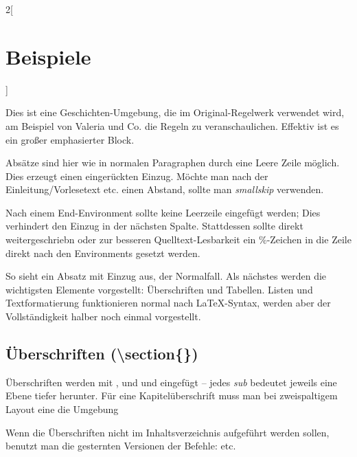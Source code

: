 \documentclass[linksbund,ATvorVT]{rpg-ilaris}
\begin{document}
\begin{multicols}{2}[        %
		\chapter*{Beispiele}  %
		]                    %

\begin{geschichte}
	Dies ist eine Geschichten-Umgebung, die im Original-Regelwerk verwendet wird, am Beispiel von Valeria und Co. die Regeln zu veranschaulichen. Effektiv ist es ein großer emphasierter Block.

	Absätze sind hier wie in normalen Paragraphen durch eine Leere Zeile möglich. Dies erzeugt einen eingerückten Einzug. Möchte man nach der Einleitung/Vorlesetext etc. einen Abstand, sollte man \emph{smallskip} verwenden.
\end{geschichte}

Nach einem End-Environment sollte keine Leerzeile eingefügt werden; Dies verhindert den Einzug in der nächsten Spalte. Stattdessen sollte direkt weitergeschriebn oder zur besseren Quelltext-Lesbarkeit ein \%-Zeichen in die Zeile direkt nach den Environments gesetzt werden.

So sieht ein Absatz mit Einzug aus, der Normalfall. Als nächstes werden die wichtigsten Elemente vorgestellt: Überschriften und Tabellen. Listen und Textformatierung funktionieren normal nach \LaTeX-Syntax, werden aber der Vollständigkeit halber noch einmal vorgestellt.


	\section[Überschriften]{Überschriften (\textbackslash{}section\{\})}
	Überschriften werden mit ,  und  und  eingefügt -- jedes \emph{sub} bedeutet jeweils eine Ebene tiefer herunter.
	Für eine Kapitelüberschrift muss man bei zweispaltigem Layout eine  die Umgebung  

	Wenn die Überschriften nicht im Inhaltsverzeichnis aufgeführt werden sollen, benutzt man die gesternten Versionen der Befehle:  etc.

\end{multicols}
\end{document}
